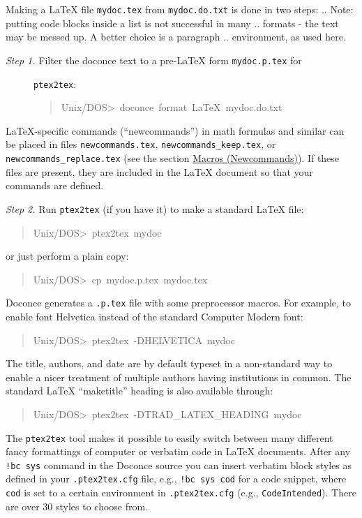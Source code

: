 \documentclass[a4paper,english]{article}
\begin{document}
Making a LaTeX file \texttt{mydoc.tex} from \texttt{mydoc.do.txt} is done in two steps:
.. Note: putting code blocks inside a list is not successful in many
.. formats - the text may be messed up. A better choice is a paragraph
.. environment, as used here.
%
\begin{description}
\item[{\emph{Step 1.} Filter the doconce text to a pre-LaTeX form \texttt{mydoc.p.tex} for}] \leavevmode 
\texttt{ptex2tex}:
%
\begin{quote}{\ttfamily \raggedright \noindent
Unix/DOS>~doconce~format~LaTeX~mydoc.do.txt
}
\end{quote}

\end{description}

LaTeX-specific commands (``newcommands'') in math formulas and similar
can be placed in files \texttt{newcommands.tex}, \texttt{newcommands\_keep.tex}, or
\texttt{newcommands\_replace.tex} (see the section \hyperref[macros-newcommands]{Macros (Newcommands)}).
If these files are present, they are included in the LaTeX document
so that your commands are defined.

\emph{Step 2.} Run \texttt{ptex2tex} (if you have it) to make a standard LaTeX file:
%
\begin{quote}{\ttfamily \raggedright \noindent
Unix/DOS>~ptex2tex~mydoc
}
\end{quote}

or just perform a plain copy:
%
\begin{quote}{\ttfamily \raggedright \noindent
Unix/DOS>~cp~mydoc.p.tex~mydoc.tex
}
\end{quote}

Doconce generates a \texttt{.p.tex} file with some preprocessor macros.
For example, to enable font Helvetica instead of the standard
Computer Modern font:
%
\begin{quote}{\ttfamily \raggedright \noindent
Unix/DOS>~ptex2tex~-DHELVETICA~mydoc
}
\end{quote}

The title, authors, and date are by default typeset in a non-standard
way to enable a nicer treatment of multiple authors having
institutions in common. The standard LaTeX ``maketitle'' heading
is also available through:
%
\begin{quote}{\ttfamily \raggedright \noindent
Unix/DOS>~ptex2tex~-DTRAD\_LATEX\_HEADING~mydoc
}
\end{quote}

The \texttt{ptex2tex} tool makes it possible to easily switch between many
different fancy formattings of computer or verbatim code in LaTeX
documents. After any \texttt{!bc sys} command in the Doconce source you can
insert verbatim block styles as defined in your \texttt{.ptex2tex.cfg}
file, e.g., \texttt{!bc sys cod} for a code snippet, where \texttt{cod} is set to
a certain environment in \texttt{.ptex2tex.cfg} (e.g., \texttt{CodeIntended}).
There are over 30 styles to choose from.
\end{document}

